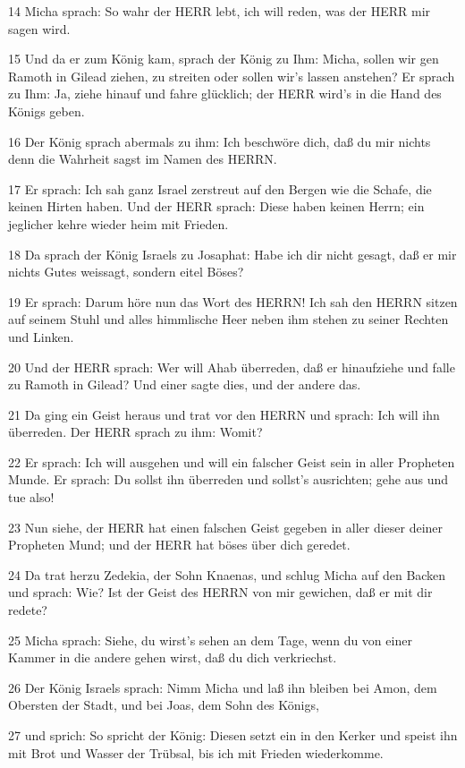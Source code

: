 \par 14 Micha sprach: So wahr der HERR lebt, ich will reden, was der HERR mir sagen wird.
\par 15 Und da er zum König kam, sprach der König zu Ihm: Micha, sollen wir gen Ramoth in Gilead ziehen, zu streiten oder sollen wir's lassen anstehen? Er sprach zu Ihm: Ja, ziehe hinauf und fahre glücklich; der HERR wird's in die Hand des Königs geben.
\par 16 Der König sprach abermals zu ihm: Ich beschwöre dich, daß du mir nichts denn die Wahrheit sagst im Namen des HERRN.
\par 17 Er sprach: Ich sah ganz Israel zerstreut auf den Bergen wie die Schafe, die keinen Hirten haben. Und der HERR sprach: Diese haben keinen Herrn; ein jeglicher kehre wieder heim mit Frieden.
\par 18 Da sprach der König Israels zu Josaphat: Habe ich dir nicht gesagt, daß er mir nichts Gutes weissagt, sondern eitel Böses?
\par 19 Er sprach: Darum höre nun das Wort des HERRN! Ich sah den HERRN sitzen auf seinem Stuhl und alles himmlische Heer neben ihm stehen zu seiner Rechten und Linken.
\par 20 Und der HERR sprach: Wer will Ahab überreden, daß er hinaufziehe und falle zu Ramoth in Gilead? Und einer sagte dies, und der andere das.
\par 21 Da ging ein Geist heraus und trat vor den HERRN und sprach: Ich will ihn überreden. Der HERR sprach zu ihm: Womit?
\par 22 Er sprach: Ich will ausgehen und will ein falscher Geist sein in aller Propheten Munde. Er sprach: Du sollst ihn überreden und sollst's ausrichten; gehe aus und tue also!
\par 23 Nun siehe, der HERR hat einen falschen Geist gegeben in aller dieser deiner Propheten Mund; und der HERR hat böses über dich geredet.
\par 24 Da trat herzu Zedekia, der Sohn Knaenas, und schlug Micha auf den Backen und sprach: Wie? Ist der Geist des HERRN von mir gewichen, daß er mit dir redete?
\par 25 Micha sprach: Siehe, du wirst's sehen an dem Tage, wenn du von einer Kammer in die andere gehen wirst, daß du dich verkriechst.
\par 26 Der König Israels sprach: Nimm Micha und laß ihn bleiben bei Amon, dem Obersten der Stadt, und bei Joas, dem Sohn des Königs,
\par 27 und sprich: So spricht der König: Diesen setzt ein in den Kerker und speist ihn mit Brot und Wasser der Trübsal, bis ich mit Frieden wiederkomme.
